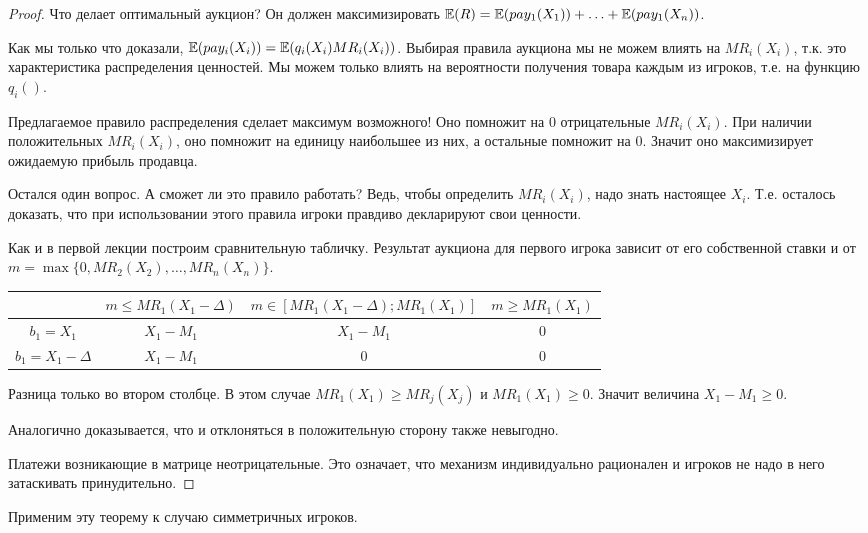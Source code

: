 \begin{proof}
Что делает оптимальный аукцион? Он должен максимизировать $ \mathbb{E}(R)=\mathbb{E}(pay_{1}(X_{1}))+\ldots+ \mathbb{E}(pay_{1}(X_{n}))$. 

Как мы только что доказали, $\mathbb{E}(pay_{i}(X_{i}))=\mathbb{E}(q_{i}(X_{i})MR_{i}(X_{i}))$. Выбирая правила аукциона мы не можем влиять на $ MR_{i}(X_{i}) $, т.к. это характеристика распределения ценностей. Мы можем только влиять на вероятности получения товара каждым из игроков, т.е. на функцию $ q_{i}() $. 

Предлагаемое правило распределения сделает максимум возможного! Оно помножит на 0 отрицательные $ MR_{i}(X_{i}) $. При наличии положительных $ MR_{i}(X_{i}) $, оно помножит на единицу наибольшее из них, а остальные помножит на 0. Значит оно максимизирует ожидаемую прибыль продавца.

Остался один вопрос. А сможет ли это правило работать? Ведь, чтобы определить $ MR_{i}(X_{i}) $, надо знать настоящее $ X_{i} $. Т.е. осталось доказать, что при использовании этого правила игроки правдиво декларируют свои ценности.

Как и в первой лекции построим сравнительную табличку.  Результат аукциона для первого игрока зависит от его собственной ставки и от $ m=\max\{0,MR_{2}(X_{2}),\ldots,MR_{n}(X_{n})\} $.
\begin{tabular}{c|ccc}
& $ m\leq MR_{1}(X_{1}-\Delta) $ & $ m\in [MR_{1}(X_{1}-\Delta);MR_{1}(X_{1})] $ & $ m\geq MR_{1}(X_{1})$ \\ 
\hline 
$ b_{1}=X_{1} $ & $ X_{1}-M_{1} $ & $ X_{1}-M_{1} $ &  0\\ 
$b_{1}=X_{1}-\Delta $ & $ X_{1}-M_{1} $ & 0 & 0 \\ 
\end{tabular} 

Разница только во втором столбце. В этом случае $ MR_{1}(X_{1})\geq MR_{j}(X_{j}) $ и $ MR_{1}(X_{1})\geq 0 $. Значит величина $ X_{1}-M_{1}\geq 0 $.

Аналогично доказывается, что и отклоняться в положительную сторону также невыгодно.

Платежи возникающие в матрице неотрицательные. Это означает, что механизм индивидуально рационален и игроков не надо в него затаскивать принудительно.
\end{proof}

Применим эту теорему к случаю симметричных игроков. 

